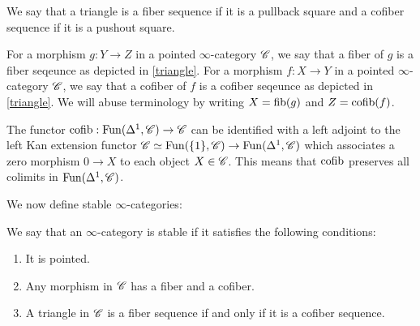 \documentclass[../../thesis.tex]{subfiles}
\begin{document}
\begin{definition}
    We say that a triangle is a fiber sequence if it is a pullback square and a cofiber sequence if it is a pushout square.
\end{definition}
\begin{definition}[{\cite{HA}[Definition 1.1.1.6.]}]
    For a morphism $g: Y \to Z$ in a pointed $\infty$-category $\mathscr{C}$, we say that a fiber of $g$ is a fiber seqeunce as depicted in \ref{triangle}.
    For a morphism $f: X \to Y$ in a pointed $\infty$-category $\mathscr{C}$, we say that a cofiber of $f$ is a cofiber seqeunce as depicted in \ref{triangle}.
    We will abuse terminology by writing $X = \operatorname{fib}(g)$ and $Z=\operatorname{cofib}(f)$.
\end{definition}
\begin{remark}[{\cite{HA}[Remark 1.1.1.8.]}]
    The functor $\operatorname{cofib}: \mathrm{Fun}(\Delta^1, \mathscr{C})\to \mathscr{C}$ can be identified with a left adjoint to the left Kan extension functor $\mathscr{C} \simeq \mathrm{Fun}(\{1\}, \mathscr{C}) \to \mathrm{Fun}(\Delta^1, \mathscr{C})$ which associates a zero morphism $0 \to X$ to each object $X \in \mathscr{C}$.
    This means that $\operatorname{cofib}$ preserves all colimits in $\mathrm{Fun}(\Delta^1, \mathscr{C})$.
\end{remark}
We now define stable $\infty$-categories:
\begin{definition}[{\cite{HA}[Definition 1.1.1.9.]}]
    We say that an $\infty$-category is stable if it satisfies the following conditions:
    \begin{enumerate}
        \item It is pointed.
        \item Any morphism in $\mathscr{C}$ has a fiber and a cofiber.
        \item A triangle in $\mathscr{C}$ is a fiber sequence if and only if it is a cofiber sequence.
    \end{enumerate}
\end{definition}
\end{document}
